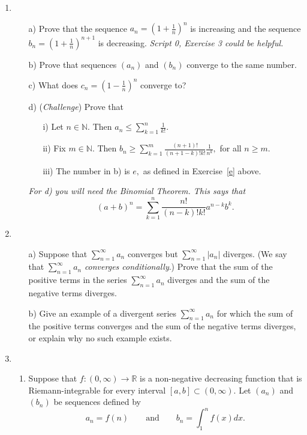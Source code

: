 \documentclass[openany, amssymb, psamsfonts]{amsart}
\newcommand{\bbN}{\mathbb{N}}
\newcommand{\bbR}{\mathbb{R}}
\theoremstyle{definition}
\numberwithin{equation}{section}
\begin{document}
\begin{enumerate}
\item 
\begin{enumerate}
\item[a)] Prove that the sequence $a_n=(1+\frac{1}{n})^n$ is increasing and the sequence $b_n=(1+\frac{1}{n})^{n+1}$ is decreasing. {\em Script 0, Exercise 3 could be helpful.}
\item[b)] Prove that sequences $(a_n)$ and $(b_n)$ converge to the same number.
\item[c)] What does $c_n=(1-\frac{1}{n})^{n}$ converge to?
\item[d)] ({\em Challenge}) Prove that 
\begin{enumerate}
\item[i)] Let $n\in \bbN.$ Then $a_n\leq \sum_{k=1}^n \frac{1}{k!}.$
\item[ii)]  Fix $m\in \bbN.$ Then $b_n \geq \sum_{k=1}^m \frac{(n+1)!}{(n+1-k)!k!}\frac{1}{n^k},$ for all $n\geq m.$
\item[iii)] The number in b) is $e,$ as defined in Exercise~\ref{e} above.
\end{enumerate}
{\em For d) you will need the Binomial Theorem. This says that $$(a+b)^n = \sum_{k=1}^n \frac{n!}{(n-k)! k!} a^{n-k}b^k.$$}
\end{enumerate}



\item 
\begin{enumerate}
\item[a)] Suppose that $\displaystyle \sum_{n=1}^\infty a_n$ converges but $\displaystyle \sum_{n=1}^\infty | a_n| $ diverges. (We say that $\displaystyle \sum_{n=1}^\infty a_n$ {\em converges conditionally}.) Prove that the sum of the positive terms in the series $\displaystyle \sum_{n=1}^\infty a_n$  diverges and the sum of the negative terms diverges. 
\item[b)] Give an example of a divergent series $\displaystyle \sum_{n=1}^\infty a_n$ for which the sum of the positive terms converges and the sum of the negative terms diverges, or explain why no such example exists.
\end{enumerate}


\item 
\begin{enumerate}
\item Suppose that $f:(0,\infty)\to \bbR$ is a non-negative decreasing function that is Riemann-integrable for every interval $[a,b]\subset (0,\infty).$ Let $(a_n)$ and $(b_n)$ be sequences defined by 
$$ a_n=f(n) \qquad\text{and}\qquad b_n=\int_1^nf(x)dx.$$


\end{enumerate}
\end{enumerate}
\end{document}
